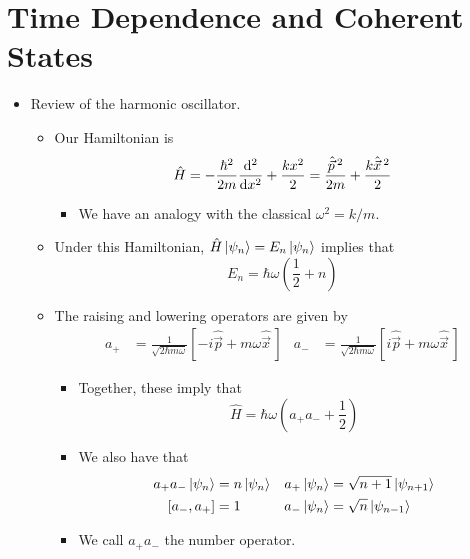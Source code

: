 \documentclass[../notes.tex]{subfiles}
\begin{document}
\section{Time Dependence and Coherent States}
\begin{itemize}
    \item {}Review of the harmonic oscillator.
    \begin{itemize}
        \item Our Hamiltonian is
        \begin{equation*}
            \hat{H} = -\frac{\hbar^2}{2m}\dv[2]{x}+\frac{kx^2}{2} = \frac{\hat{\vec{p}}{\,}^2}{2m}+\frac{k\hat{\vec{x}}{\,}^2}{2}
        \end{equation*}
        \begin{itemize}
            \item We have an analogy with the classical $\omega^2=k/m$.
        \end{itemize}
        \item Under this Hamiltonian, $\hat{H}\ket{\psi_n}=E_n\ket{\psi_n}$ implies that
        \begin{equation*}
            E_n = \hbar\omega\left( \frac{1}{2}+n \right)
        \end{equation*}
        \item The raising and lowering operators are given by
        \begin{align*}
            a_+ &= \frac{1}{\sqrt{2\hbar m\omega}}[-i\hat{\vec{p}}+m\omega\hat{\vec{x}}\,]&
            a_- &= \frac{1}{\sqrt{2\hbar m\omega}}[i\hat{\vec{p}}+m\omega\hat{\vec{x}}\,]
        \end{align*}
        \begin{itemize}
            \item Together, these imply that
            \begin{equation*}
                \hat{H} = \hbar\omega\left( a_+a_-+\frac{1}{2} \right)
            \end{equation*}
            \item We also have that
            \begin{align*}
                a_+a_-\ket{\psi_n} &= n\ket{\psi_n}&
                    a_+\ket{\psi_n} &= \sqrt{n+1}\ket{\psi_{n+1}}\\
                [a_-,a_+] &= 1&
                    a_-\ket{\psi_n} &= \sqrt{n}\ket{\psi_{n-1}}
            \end{align*}
            \item We call $a_+a_-$ the number operator.

\end{itemize}
\end{itemize}
\end{itemize}
\end{document}
